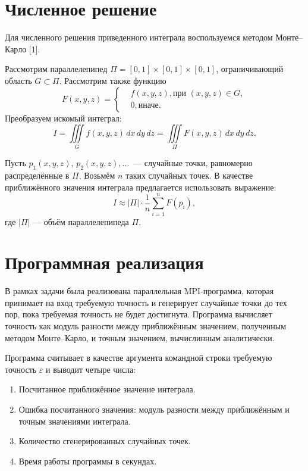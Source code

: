     \section{Численное решение}

    Для численного решения приведенного интеграла воспользуемся методом Монте--Карло [1].

    Рассмотрим параллелепипед $\Pi=[0,1]\times[0,1]\times[0,1]$, ограничивающий область $G\subset\Pi$.
    Рассмотрим также функцию
    $$
        F(x,y,z) = \left\{\begin{aligned}
            &f(x,y,z), \mbox{при $(x,y,z)\in G,$}\\
            &0, \mbox{иначе.}
        \end{aligned}\right.
    $$
    Преобразуем искомый интеграл:
    $$
        I = \iiint\limits_{G}f(x,y,z)\,dx\,dy\,dz = \iiint\limits_{\Pi}F(x,y,z)\,dx\,dy\,dz.
    $$

    Пусть $p_1(x,y,z),\,p_2(x,y,z),\ldots$~--- случайные точки, равномерно распределённые в $\Pi$.
    Возьмём $n$ таких случайных точек.
    В качестве приближённого значения интеграла предлагается использовать выражение:
    \begin{equation}
        I \approx |\Pi|\cdot\frac{1}{n}\sum\limits_{i=1}^{n}F(p_i),
    \end{equation}
    где $|\Pi|$ --- объём параллелепипеда $\Pi$.


    \section{Программная реализация}
    В рамках задачи была реализована параллельная MPI-программа, которая принимает на вход требуемую точность и генерирует случайные точки до тех пор, пока требуемая точность не будет достигнута.
    Программа вычисляет точность как модуль разности между приближённым значением, полученным методом Монте--Карло, и точным значением, вычислинным аналитически.
    
    Программа считывает в качестве аргумента командной строки требуемую точность $\varepsilon$ и выводит четыре числа:
    \begin{enumerate}
        \item Посчитанное приближённое значение интеграла.
        \item Ошибка посчитанного значения: модуль разности между приближённым и точным значениями интеграла.
        \item Количество сгенерированных случайных точек.
        \item Время работы программы в секундах.
    \end{enumerate}

